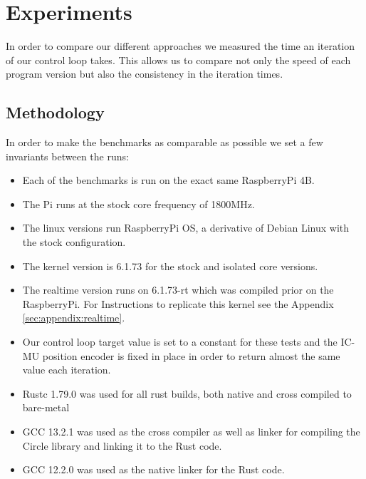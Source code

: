 \chapter{Experiments}
\label{chap:experiments}

In order to compare our different approaches we measured the time an iteration of our control loop takes.
This allows us to compare not only the speed of each program version but also the consistency in the iteration times.

\section{Methodology}
\label{sec:experiments:methodology}

In order to make the benchmarks as comparable as possible we set a few invariants between the runs:
\begin{itemize}
    \item Each of the benchmarks is run on the exact same RaspberryPi 4B.
    \item The Pi runs at the stock core frequency of 1800MHz.
    \item The linux versions run RaspberryPi OS, a derivative of Debian Linux with the stock configuration.
    \item The kernel version is 6.1.73 for the stock and isolated core versions.
    \item The realtime version runs on 6.1.73-rt which was compiled prior on the RaspberryPi. For Instructions to replicate this kernel see the Appendix \ref{sec:appendix:realtime}.
    \item Our control loop target value is set to a constant for these tests and the IC-MU position encoder is fixed in place in order to return almost the same value each iteration.
  \item Rustc 1.79.0 was used for all rust builds, both native and cross compiled to bare-metal
  \item GCC 13.2.1 was used as the cross compiler as well as linker for compiling the Circle library and linking it to the Rust code.
  \item GCC 12.2.0 was used as the native linker for the Rust code.
\end{itemize}

